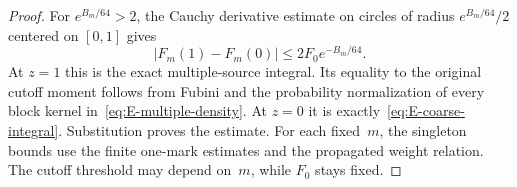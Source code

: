 \begin{proof}
For $e^{B_m/64}>2$, the Cauchy derivative estimate on circles of radius $e^{B_m/64}/2$ centered on $[0,1]$ gives
\begin{equation*}
 |F_m(1)-F_m(0)|\le2F_0e^{-B_m/64}.
\end{equation*}
At $z=1$ this is the exact multiple-source integral. Its equality to the original cutoff moment follows from Fubini and the probability normalization of every block kernel in~\eqref{eq:E-multiple-density}. At $z=0$ it is exactly~\eqref{eq:E-coarse-integral}. Substitution proves the estimate. For each fixed~$m$, the singleton bounds use the finite one-mark estimates and the propagated weight relation. The cutoff threshold may depend on~$m$, while $F_0$ stays fixed.
\end{proof}
